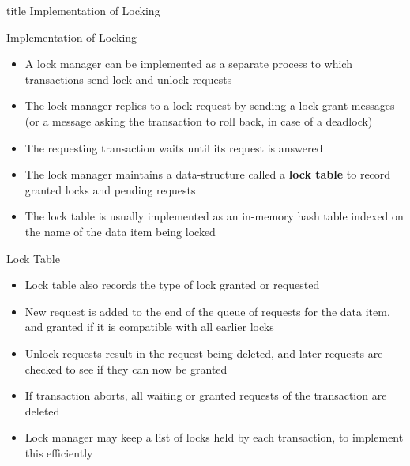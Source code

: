 \documentclass[aspectratio=169, xcolor=dvipsnames]{beamer}
\begin{document}
\begin{frame}
  \vfill
  \centering
  \begin{beamercolorbox}[sep=8pt,center,shadow=true,rounded=true]{title}
    Implementation of Locking\par%
  \end{beamercolorbox}
  \vfill
\end{frame}

\begin{frame}{Implementation of Locking}
    \begin{itemize}[<+->]
        \item A lock manager can be implemented as a separate process to which transactions send lock and unlock requests
        \item The lock manager replies to a lock request by sending a lock grant messages (or a message asking the transaction to roll back, in case of a deadlock)
        \item The requesting transaction waits until its request is answered
        \item The lock manager maintains a data-structure called a \textbf{lock table} to record granted locks and pending requests
        \item The lock table is usually implemented as an in-memory hash table indexed on the name of the data item being locked
    \end{itemize}
\end{frame}

\begin{frame}{Lock Table}
    \begin{itemize}[<+->]
        \item Lock table also records the type of lock granted or requested
        \item New request is added to the end of the queue of requests for the data item, and granted if it is compatible with all earlier locks
        \item Unlock requests result in the request being deleted, and later requests are checked to see if they can now be granted
        \item If transaction aborts, all waiting or granted requests of the transaction are deleted
        \item Lock manager may keep a list of locks held by each transaction, to implement this efficiently
    \end{itemize}
\end{frame}
\end{document}
